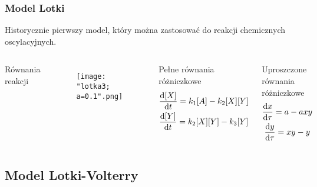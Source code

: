 \documentclass{beamer}
\begin{document}
\begin{frame}
\frametitle{Model Lotki}
\small Historycznie pierwszy model, który można zastosować do reakcji chemicznych oscylacyjnych. \normalsize
\begin{columns}
\begin{block}{Równania reakcji}
\begin{center}
	 \\
	 \\
\end{center}
\end{block}
\begin{figure}
\texttt{[image: "lotka3; a=0.1".png]}
\end{figure}
\begin{block}{Pełne równania różniczkowe}
\begin{gather*}
	\dv{[X]}{t}=k_{1}[A]-k_{2}[X][Y] \\
	\dv{[Y]}{t}=k_{2}[X][Y]-k_{3}[Y]
\end{gather*}
\end{block}
\begin{block}{Uproszczone równania różniczkowe}
\begin{gather*}
	\dv{x}{\tau} = a-axy \\
	\dv{y}{\tau} = xy-y
\end{gather*}
\end{block}
\end{columns}
\end{frame}

\subsection{Model Lotki-Volterry}
\end{document}
